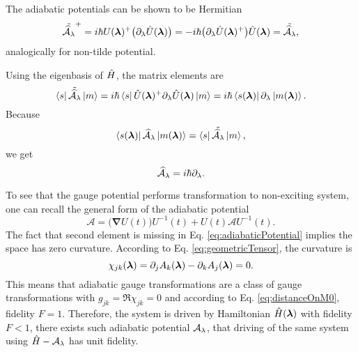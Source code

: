 The adiabatic potentials can be shown to be Hermitian
\begin{equation}
     \tilde{\AA_\lambda}^+=i\hbar U(\llambda)^+\big(\partial_\lambda\U(\llambda)\big)=-i\hbar\big(\partial_\lambda\U(\llambda)^+\big)\U(\llambda) = \tilde{\AA_\lambda},
     \label{eq:counterdiabaticPotentialTwoSystems}
\end{equation}
analogically for non-tilde potential.

Using the eigenbasis of $\hat{H}$, the matrix elements are
\begin{equation}
    \bra{s}\tilde{\mathcal{\widehat{A}}_\lambda}\ket{m}=i\hbar\bra{s}\hat{U}({\bm\lambda})^+\partial_\lambda\hat{U}({\bm\lambda})\ket{m} = i\hbar\bra{s({\bm\lambda})}\partial_\lambda\ket{m({\bm\lambda})}.
\end{equation}
Because
\begin{equation}
    \bra{s({\bm\lambda})}\mathcal{\widehat{A}}_\lambda\ket{ m({\bm\lambda})}= \bra{s}\tilde{\mathcal{\widehat{A}}_\lambda}\ket{m},
\end{equation}
we get
\begin{equation}
    \AA_\lambda = i\hbar\partial_\lambda.
    \label{eq:adiabaticPotentialDefinition}
\end{equation}


To see that the gauge potential performs transformation to non-exciting system, one can recall the general form of the adiabatic potential
\begin{equation}
    \bm{\mathcal A}=\big(\bm\nabla U(t)\big)U^{-1}(t) + U(t) \bm{\mathcal A} U^{-1}(t).
\end{equation}
The fact that second element is missing in Eq. \ref{eq:adiabaticPotential} implies the space has zero curvature. According to Eq. \ref{eq:geometricTensor}, the curvature is
\begin{equation}
    \chi_{jk}({\bm\lambda}) = \partial_j A_k({\bm\lambda})-\partial_k A_j({\bm\lambda}) = 0.
\end{equation}
This means that adiabatic gauge transformations are a class of gauge transformations with $g_{jk}=\Re\chi_{jk}=0$ and according to Eq. \ref{eq:distanceOnM0}, fidelity $F=1$. Therefore, the system is driven by Hamiltonian $\hat{H}({\bm\lambda})$ with fidelity $F<1$, there exists such adiabatic potential $\mathcal{A}_\lambda$, that driving of the same system using $\hat{H}-\mathcal{A}_\lambda$ has unit fidelity.

